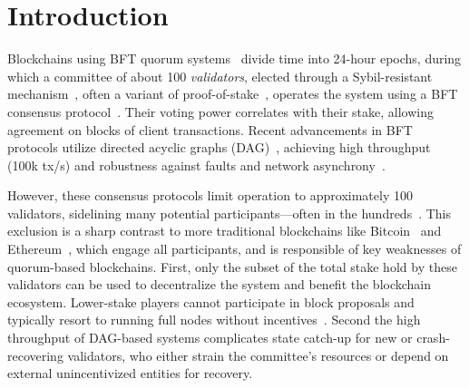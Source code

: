 \section{Introduction}

Blockchains using BFT quorum systems~\cite{sui,aptos,solana} divide time into 24-hour epochs, during which a committee of about 100 \emph{validators}, elected through a Sybil-resistant mechanism~\cite{douceur2002sybil}, often a variant of proof-of-stake~\cite{kucci2021proof}, operates the system using a BFT consensus protocol~\cite{pbft,jolteon,mysticeti}. Their voting power correlates with their stake, allowing agreement on blocks of client transactions. Recent advancements in BFT protocols utilize directed acyclic graphs (DAG)~\cite{narwhal,bullshark,shoal++,mysticeti,sailfish,bbca-chain,gradeddag,cordial-miners,fin,fino}, achieving high throughput (100k tx/s) and robustness against faults and network asynchrony~\cite{consensus-dos,narwhal}.

However, these consensus protocols limit operation to approximately 100 validators, sidelining many potential participants---often in the hundreds~\cite{sui-scan}. This exclusion is a sharp contrast to more traditional blockchains like Bitcoin~\cite{bitcoin} and Ethereum~\cite{ethereum}, which engage all participants, and is responsible of key weaknesses of quorum-based blockchains.
First, only the subset of the total stake hold by these validators can be used to decentralize the system and benefit the blockchain ecosystem. Lower-stake players cannot participate in block proposals and typically resort to running full nodes without incentives~\cite{krol2024disc}.
Second the high throughput of DAG-based systems complicates state catch-up for new or crash-recovering validators, who either strain the committee's resources or depend on external unincentivized entities for recovery.

